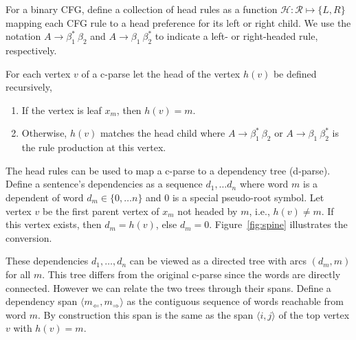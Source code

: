 \documentclass[11pt,letterpaper]{article}
\newcommand{\rules}{\mathcal{R}}
\newcommand{\Left}[1]{#1_{\Leftarrow}}
\newcommand{\Right}[1]{#1_{\Rightarrow}}
\newcommand{\Span}[1]{\langle #1 \rangle}
\newcommand{\RuleA}[3]{#1 \rightarrow #2^*\ #3}
\newcommand{\RuleB}[3]{#1 \rightarrow #2\ #3^*}
\begin{document}
For a binary CFG, define a collection of head rules as a function $\mathcal{H} : \rules \mapsto \{L, R\}$ 
mapping each CFG rule to a head preference for its left or right child. We use the notation 
$\RuleA{A}{\beta_1}{\beta_2}$ and $\RuleB{A}{\beta_1}{\beta_2}$ to indicate a left-
or right-headed rule, respectively. 

For each vertex $v$ of a c-parse let the head of the vertex $h(v)$ be defined recursively,
 
 \begin{enumerate}
  \item  If the vertex is leaf $x_m$, then $h(v)=m$.
  \item Otherwise,  $h(v)$ matches the head child where $\RuleA{A}{\beta_1}{\beta_2}$ or $\RuleB{A}{\beta_1}{\beta_2}$  is the rule production at this vertex.
  \end{enumerate}

The head rules can be used to map a c-parse to a dependency tree (d-parse).
Define a sentence's dependencies as a sequence $d_1, \ldots d_n$ 
where word $m$ is a dependent of word $d_m \in \{0, \ldots n\}$ and $0$ is 
a special pseudo-root symbol. Let vertex $v$ be the first 
parent vertex of $x_m$ not headed by $m$, i.e., $h(v) \neq m$. 
If this vertex exists, then $d_m = h(v)$, else $d_m = 0$.  
Figure~\ref{fig:spine} illustrates the conversion.





These dependencies $d_1, \ldots, d_n$ can be viewed as a directed tree with arcs
$(d_m, m)$ for all $m$. This tree differs from the original c-parse
since the words are directly connected. However we can relate the two
trees through their spans. Define a dependency span $\Span{\Left{m},
  \Right{m}}$ as the contiguous sequence of words reachable from word $m$. By
construction this span is the same as the span $\Span{i, j}$
of the top vertex $v$ with $h(v) = m$.
\end{document}
